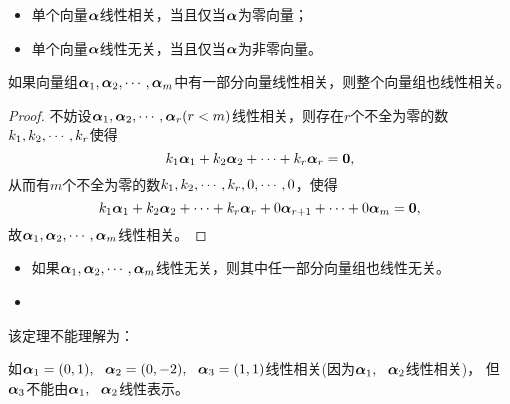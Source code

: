 \begin{zhu*}
  \begin{itemize}
  \item 单个向量$\boldsymbol{\alpha}$线性相关，当且仅当$\boldsymbol{\alpha}$为零向量；
  \item 单个向量$\boldsymbol{\alpha}$线性无关，当且仅当$\boldsymbol{\alpha}$为非零向量。        
  \end{itemize}
\end{zhu*}


\begin{li}
  如果向量组$\boldsymbol{\alpha}_1,\boldsymbol{\alpha}_2,\cdots,\boldsymbol{\alpha}_m$中有一部分向量线性相关，则整个向量组也线性相关。
\end{li}

\begin{proof}
不妨设$\boldsymbol{\alpha}_1,\boldsymbol{\alpha}_2,\cdots,\boldsymbol{\alpha}_r(r<m)$线性相关，则存在$r$个不全为零的数$k_1,k_2,\cdots,k_r$使得
$$
k_1\boldsymbol{\alpha}_1+k_2\boldsymbol{\alpha}_2+\cdots+k_r\boldsymbol{\alpha}_r=\boldsymbol{0},
$$
从而有$m$个不全为零的数$k_1,k_2,\cdots,k_r,0,\cdots,0$，使得
$$
k_1\boldsymbol{\alpha}_1+k_2\boldsymbol{\alpha}_2+\cdots+k_r\boldsymbol{\alpha}_r+0\boldsymbol{\alpha}_{r+1}+\cdots+0\boldsymbol{\alpha}_m=\boldsymbol{0},
$$
故$\boldsymbol{\alpha}_1,\boldsymbol{\alpha}_2,\cdots,\boldsymbol{\alpha}_m$线性相关。
  
\end{proof}

\begin{zhu*}
  \begin{itemize}
  \item 如果$\boldsymbol{\alpha}_1,\boldsymbol{\alpha}_2,\cdots,\boldsymbol{\alpha}_m$线性无关，则其中任一部分向量组也线性无关。              
  \item     {}
  \end{itemize}
  
\end{zhu*}


\begin{zhu*}
  该定理不能理解为：  

  如$\boldsymbol{\alpha}_1=(0,1), ~~\boldsymbol{\alpha}_2=(0,-2), ~~\boldsymbol{\alpha}_3=(1,1)$线性相关(因为$\boldsymbol{\alpha}_1,~~\boldsymbol{\alpha}_2$线性相关)，
  但$\boldsymbol{\alpha}_3$不能由$\boldsymbol{\alpha}_1,~~\boldsymbol{\alpha}_2$线性表示。
  
\end{zhu*}





